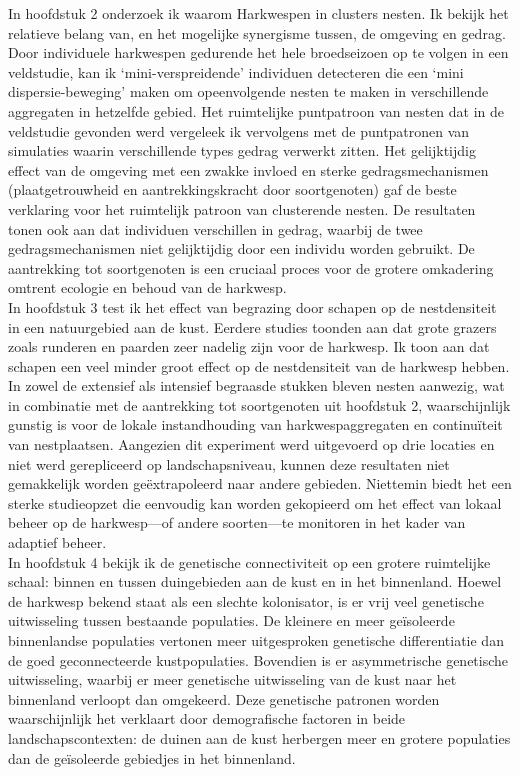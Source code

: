 \documentclass[10pt, twoside]{book} %
\begin{document}
  In hoofdstuk 2 onderzoek ik waarom Harkwespen in clusters nesten. Ik bekijk het relatieve belang van, en het mogelijke synergisme tussen, de omgeving en gedrag. Door individuele harkwespen gedurende het hele broedseizoen op te volgen in een veldstudie, kan ik   `mini-verspreidende' individuen detecteren die een `mini dispersie-beweging' maken om opeenvolgende nesten te maken in verschillende aggregaten in hetzelfde gebied. Het ruimtelijke puntpatroon van nesten dat in de veldstudie gevonden werd vergeleek ik vervolgens met de puntpatronen van simulaties waarin verschillende types gedrag verwerkt zitten. Het gelijktijdig effect van de omgeving met een zwakke invloed en sterke gedragsmechanismen (plaatgetrouwheid en aantrekkingskracht door soortgenoten) gaf de beste verklaring voor het ruimtelijk patroon van clusterende nesten. De resultaten tonen ook aan dat individuen verschillen in gedrag, waarbij de twee gedragsmechanismen niet gelijktijdig door een individu worden gebruikt. De aantrekking tot soortgenoten is een cruciaal proces voor de grotere omkadering omtrent ecologie en behoud van de harkwesp.\\
  
  In hoofdstuk 3 test ik het effect van begrazing door schapen op de nestdensiteit in een natuurgebied aan de kust. Eerdere studies toonden aan dat grote grazers zoals runderen en paarden zeer nadelig zijn voor de harkwesp. Ik toon aan dat schapen een veel minder groot effect op de nestdensiteit van de harkwesp hebben. In zowel de extensief als intensief begraasde stukken bleven nesten aanwezig, wat in combinatie met de aantrekking tot soortgenoten uit hoofdstuk 2, waarschijnlijk gunstig is voor de lokale instandhouding van harkwespaggregaten en continuïteit van nestplaatsen. Aangezien dit experiment werd uitgevoerd op drie locaties en niet werd gerepliceerd op landschapsniveau, kunnen deze resultaten niet gemakkelijk worden geëxtrapoleerd naar andere gebieden. Niettemin biedt het een sterke studieopzet die eenvoudig kan worden gekopieerd om het effect van lokaal beheer op de harkwesp---of andere soorten---te monitoren in het kader van adaptief beheer.\\
  
  In hoofdstuk 4 bekijk ik de genetische connectiviteit op een grotere ruimtelijke schaal: binnen en tussen duingebieden aan de kust en in het binnenland. Hoewel de harkwesp bekend staat als een slechte kolonisator, is er vrij veel genetische uitwisseling tussen bestaande populaties. De kleinere en meer geïsoleerde binnenlandse populaties vertonen meer uitgesproken genetische differentiatie dan de goed geconnecteerde kustpopulaties. Bovendien is er asymmetrische genetische uitwisseling, waarbij er meer genetische uitwisseling van de kust naar het binnenland verloopt dan omgekeerd. Deze genetische patronen worden waarschijnlijk het verklaart door demografische factoren in beide landschapscontexten: de duinen aan de kust herbergen meer en grotere populaties dan de geïsoleerde gebiedjes in het binnenland.\\
  
\end{document}
